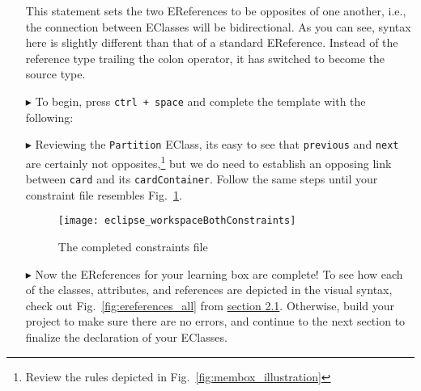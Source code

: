 \begin{itemize}
This statement sets the two EReferences to be opposites of one another, i.e., the connection between EClasses will be bidirectional. As you can see, syntax here
is slightly different than that of a standard EReference. Instead of the reference type trailing the colon operator, it has switched to become the source type.

\vspace{0.5cm}

\item[$\blacktriangleright$] To begin, press \texttt{ctrl + space} and complete the template with the following:


\item[$\blacktriangleright$] Reviewing the \texttt{Partition} EClass, its easy to see that \texttt{previous} and \texttt{next} are certainly not
opposites,\footnote{Review the rules depicted in Fig.~\ref{fig:membox_illustration}} but we do need to establish an opposing link between
\texttt{card} and its \texttt{cardContainer}. Follow the same steps until your constraint file resembles Fig.~\ref{fig:bothConstraints}.

\begin{figure}[htbp]
	\centering
  \texttt{[image: eclipse\_workspaceBothConstraints]}
	\caption{The completed constraints file}
	\label{fig:bothConstraints}
\end{figure} 

\newpage

\item[$\blacktriangleright$] Now the EReferences for your learning box are complete! To see how each of the classes, attributes, and references
are depicted in the visual syntax, check out Fig.~\ref{fig:ereferences_all} from \hyperlink{sec:static vis}{section 2.1}. Otherwise, build your project to
make sure there are no errors, and continue to the next section to finalize the declaration of your EClasses.


\end{itemize}
